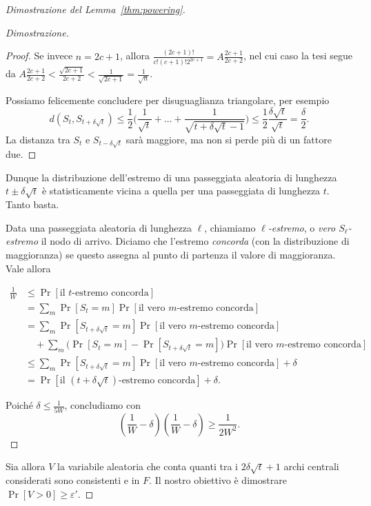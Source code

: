 \begin{proof}[Dimostrazione del Lemma~\ref{thm:powering}]
\begin{proof}[Dimostrazione]
\begin{proof}
			Se invece $n = 2c + 1$, allora
			$\frac{(2c+1)!}{c! (c+1)! 2^{2c + 1}} = A \frac{2c + 1}{2c + 2}$,
			nel cui caso la tesi segue da $A \frac{2c + 1}{2c + 2} <
			\frac{\sqrt{2c + 1}}{2c + 2} < \frac1{\sqrt{2c + 1}} = \frac1{\sqrt{n}}$.

			Possiamo felicemente concludere per disuguaglianza triangolare,
			per esempio
			\[
				d(S_t, S_{t + \delta\sqrt{t}})
				\le \frac12 \biggl(\frac1{\sqrt{t}} + \dots +
					\frac1{\sqrt{t + \delta \sqrt{t} - 1}} \biggr)
				\le \frac12 \frac{\delta \sqrt{t}}{\sqrt{t}}
				= \frac{\delta}{2}.
			\]
			La distanza tra $S_t$ e $S_{t - \delta \sqrt{t}}$ sarà maggiore, ma
			non si perde più di un fattore due.
		\end{proof}

		Dunque la distribuzione dell'estremo di una passeggiata aleatoria di
		lunghezza $t \pm \delta \sqrt{t}$ è statisticamente vicina a quella per
		una passeggiata di lunghezza $t$. Tanto basta.

		Data una passeggiata aleatoria di lunghezza $\ell$, chiamiamo
		\emph{$\ell$-estremo}, o \emph{vero $S_\ell$-estremo} il nodo di arrivo.
		Diciamo che l'estremo \emph{concorda} (con la distribuzione di maggioranza)
		se questo assegna al punto di partenza il valore di maggioranza.
		Vale allora

		\begin{align*}
			\frac1W &\le \Pr[\text{il $t$-estremo concorda}] \\
			&= \sum_m {\Pr[S_t = m]\Pr[\text{il vero $m$-estremo concorda}]} \\
			&= \sum_m \Pr[S_{t + \delta \sqrt{t}} = m] \Pr[\text{il vero
				$m$-estremo concorda}] \\
			&\quad + \sum_m \bigl(\Pr[S_t = m] - \Pr[S_{t + \delta \sqrt{t}} = m]
				\bigr) \Pr[\text{il vero $m$-estremo concorda}] \\
			&\le \sum_m { \Pr[S_{t + \delta \sqrt{t}} = m] \Pr[\text{il vero
			$m$-estremo concorda}]} + \delta \\
			&= \Pr[\text{il $(t + \delta \sqrt{t})$-estremo concorda}] + \delta.
		\end{align*}

		Poiché $\delta \le \frac1{5 W}$, concludiamo con
		\[
			\left( \frac1W - \delta \right) 
			\left( \frac1W - \delta \right) \ge \frac1{2W^2}.
		\]
	\end{proof}

	Sia allora $V$ la variabile aleatoria che conta quanti tra i
	$2 \delta \sqrt{t} + 1$ archi centrali considerati sono consistenti e in
	$F$. Il nostro obiettivo è dimostrare $\Pr[V > 0] \ge \varepsilon'$.


\end{proof}
